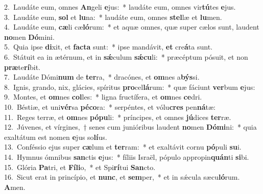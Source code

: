 {2.~}Laudáte eum, omnes \textbf{An}geli \textbf{e}jus:~* laudáte eum, omnes vir\textbf{tú}tes \textbf{e}jus.\\
{3.~}Laudáte eum, \textbf{sol} et \textbf{lu}na:~* laudáte eum, omnes \textbf{stel}læ et \textbf{lu}men.\\
{4.~}Laudáte eum, \textbf{cæ}li cæ\textbf{ló}rum:~* et aquæ omnes, quæ super cælos sunt, laudent \textbf{no}men \textbf{Dó}mini.\\
{5.~}Quia ipse \textbf{di}xit, et \textbf{fa}\textbf{cta} sunt:~* ipse mandávit, \textbf{et} cre\textbf{á}ta sunt.\\
{6.~}Státuit ea in ætérnum, et in \textbf{sǽ}culum \textbf{sǽ}\textbf{cu}li:~* præcéptum pósuit, et non \textbf{præ}te\textbf{rí}bit.\\
{7.~}Laudáte Dómi\textbf{num} de \textbf{ter}ra,~* dracónes, et \textbf{om}nes a\textbf{býs}si.\\
{8.~}Ignis, grando, nix, glácies, spíritus \textbf{pro}cel\textbf{lá}rum:~* quæ fáciunt \textbf{ver}bum \textbf{e}jus:\\
{9.~}Montes, et \textbf{om}nes \textbf{col}les:~* ligna fructífera, et \textbf{om}nes \textbf{ce}dri.\\
{10.~}Béstiæ, et uni\textbf{vér}sa \textbf{pé}\textbf{co}ra:~* serpéntes, et vólu\textbf{cres} pen\textbf{ná}tæ:\\
{11.~}Reges terræ, et \textbf{om}nes \textbf{pó}\textbf{pu}li:~* príncipes, et omnes \textbf{jú}dices \textbf{ter}ræ.\\
{12.~}Júvenes, et vírgines,~† senes cum junióribus laudent \textbf{no}men \textbf{Dó}\textbf{mi}ni:~* quia exaltátum est nomen \textbf{e}jus so\textbf{lí}us.\\
{13.~}Conféssio ejus super \textbf{cæ}lum et \textbf{ter}ram:~* et exaltávit cornu \textbf{pó}puli \textbf{su}i.\\
{14.~}Hymnus ómnibus \textbf{san}ctis \textbf{e}jus:~* fíliis Israël, pópulo appropin\textbf{quán}ti \textbf{si}bi.\\
{15.~}Glória \textbf{Pa}tri, et \textbf{Fí}\textbf{li}o,~* et Spi\textbf{rí}tui \textbf{San}cto.\\
{16.~}Sicut erat in princípio, et \textbf{nunc}, et \textbf{sem}per,~* et in sǽcula sæcu\textbf{ló}rum. \textbf{A}men.\\
